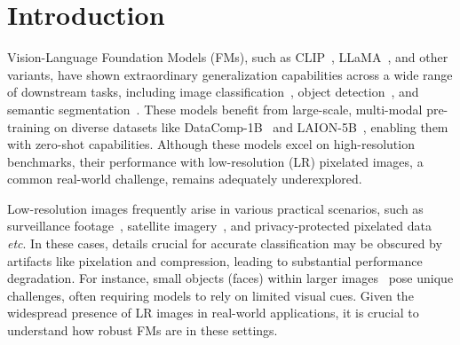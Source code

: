 \section{Introduction}

Vision-Language Foundation Models (FMs), such as CLIP~\citep{radford2021learning}, LLaMA~\citep{touvron2023llama}, and other variants, have shown extraordinary generalization capabilities across a wide range of downstream tasks, including image classification~\citep{ilharco_gabriel_2021_5143773}, object detection~\citep{zhong2022regionclip}, and semantic segmentation~\citep{xu2022odise}. These models benefit from large-scale, multi-modal pre-training on diverse datasets like DataComp-1B~\citep{datacomp} and LAION-5B~\citep{schuhmann2022laion}, 
enabling them with zero-shot capabilities.
Although these models excel on high-resolution benchmarks, their performance with low-resolution (LR) pixelated images, a common real-world challenge, remains adequately underexplored.


Low-resolution images frequently arise in various practical scenarios, such as surveillance footage~\citep{davila2023mevid}, satellite imagery~\citep{Patil2017ClassificationOL}, and privacy-protected pixelated data~\citep{10.1145/3394171.3413972} \textit{etc}. In these cases, details crucial for accurate classification may be obscured by artifacts like pixelation and compression, leading to substantial performance degradation. 
For instance, small objects (faces) within larger images~\citep{cheng2019low} pose unique challenges, often requiring models to rely on limited visual cues. Given the widespread presence of LR images in real-world applications, it is crucial to understand how robust FMs are in these settings.


